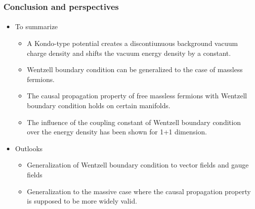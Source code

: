 \documentclass[english]{beamer}
\begin{document}
\begin{frame}[shrink=0]
\frametitle{Conclusion and perspectives}
\framesubtitle{}

\begin{itemize}
\item<1-> To summarize
	\begin{itemize}
	\item<2-> A Kondo-type potential creates a discontiunuous background vacuum charge density and shifts the vacuum energy density by a constant.
	\item<3-> Wentzell boundary condition can be generalized to the case of massless fermions.
	\item<4-> The causal propagation property of free massless fermions with Wentzell boundary condition holds on certain manifolds.
	\item<5-> The influence of the coupling constant of Wentzell boundary condition over the energy density has been shown for 1+1 dimension.
	\end{itemize}
\item<6-> Outlooks
	\begin{itemize}
	\item Generalization of Wentzell boundary condition to vector fields and gauge fields
	\item Generalization to the massive case where the causal propagation property is supposed to be more widely valid.
	\end{itemize}
\end{itemize}
\end{frame}
\end{document}
